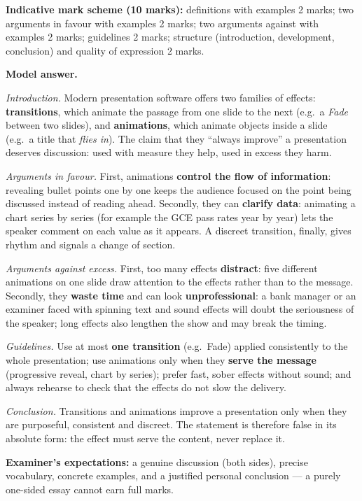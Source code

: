 \documentclass[11pt]{article}
\begin{document}
\begin{corrige}
\textbf{Indicative mark scheme (10 marks):} definitions with examples 2 marks; two arguments in favour with examples 2 marks; two arguments against with examples 2 marks; guidelines 2 marks; structure (introduction, development, conclusion) and quality of expression 2 marks.

\textbf{Model answer.}

\emph{Introduction.} Modern presentation software offers two families of effects: \textbf{transitions}, which animate the passage from one slide to the next (e.g.\ a \emph{Fade} between two slides), and \textbf{animations}, which animate objects inside a slide (e.g.\ a title that \emph{flies in}). The claim that they ``always improve'' a presentation deserves discussion: used with measure they help, used in excess they harm.

\emph{Arguments in favour.} First, animations \textbf{control the flow of information}: revealing bullet points one by one keeps the audience focused on the point being discussed instead of reading ahead. Secondly, they can \textbf{clarify data}: animating a chart series by series (for example the GCE pass rates year by year) lets the speaker comment on each value as it appears. A discreet transition, finally, gives rhythm and signals a change of section.

\emph{Arguments against excess.} First, too many effects \textbf{distract}: five different animations on one slide draw attention to the effects rather than to the message. Secondly, they \textbf{waste time} and can look \textbf{unprofessional}: a bank manager or an examiner faced with spinning text and sound effects will doubt the seriousness of the speaker; long effects also lengthen the show and may break the timing.

\emph{Guidelines.} Use at most \textbf{one transition} (e.g.\ Fade) applied consistently to the whole presentation; use animations only when they \textbf{serve the message} (progressive reveal, chart by series); prefer fast, sober effects without sound; and always rehearse to check that the effects do not slow the delivery.

\emph{Conclusion.} Transitions and animations improve a presentation only when they are purposeful, consistent and discreet. The statement is therefore false in its absolute form: the effect must serve the content, never replace it.

\textbf{Examiner's expectations:} a genuine discussion (both sides), precise vocabulary, concrete examples, and a justified personal conclusion — a purely one-sided essay cannot earn full marks.
\end{corrige}
\end{document}
